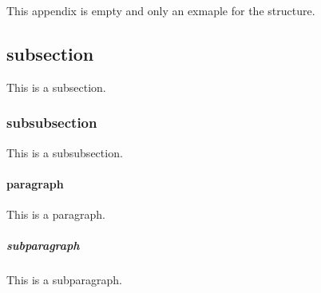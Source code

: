 

This appendix is empty and only an exmaple for the structure.


\subsection{subsection}

This is a subsection.

\subsubsection{subsubsection}

This is a subsubsection.
\paragraph{paragraph}
This is a paragraph.
\subparagraph{subparagraph}
This is a subparagraph.

